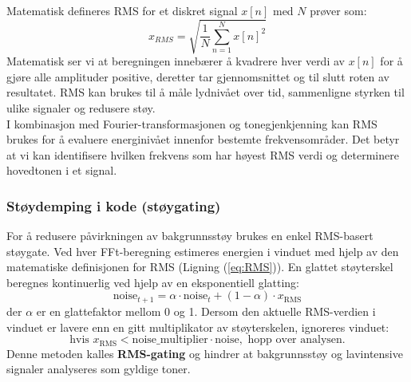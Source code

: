 Matematisk defineres RMS for et diskret signal $x[n]$ med $N$ prøver som:
\begin{equation}
    x_{RMS} = \sqrt{\frac{1}{N} \sum_{n=1}^{N} x[n]^2}
    \label{eq:RMS}
\end{equation}
\noindent
Matematisk ser vi at beregningen innebærer å kvadrere hver verdi av $x[n]$ for å gjøre alle amplituder positive, deretter tar gjennomsnittet og til slutt roten av resultatet. RMS kan brukes til å måle lydnivået over tid, sammenligne styrken til ulike signaler og redusere støy. \\
I kombinasjon med Fourier-transformasjonen og tonegjenkjenning kan RMS brukes for å evaluere energinivået innenfor bestemte frekvensområder. Det betyr at vi kan identifisere hvilken frekvens som har høyest RMS verdi og determinere hovedtonen i et signal.

\subsubsection{Støydemping i kode (støygating)}
For å redusere påvirkningen av bakgrunnsstøy brukes en enkel RMS-basert støygate. Ved hver FFt-beregning estimeres energien i vinduet med hjelp av den matematiske definisjonen for RMS (Ligning (\ref{eq:RMS})). En glattet støyterskel beregnes kontinuerlig ved hjelp av en eksponentiell glatting:
\[
\text{noise}_{t+1} = \alpha \cdot \text{noise}_t + (1 - \alpha) \cdot x_{\text{RMS}}
\]
der $\alpha$ er en glattefaktor mellom 0 og 1. 
Dersom den aktuelle RMS-verdien i vinduet er lavere enn en gitt multiplikator av støyterskelen, ignoreres vinduet:
\[
\text{hvis } x_{\text{RMS}} < \text{noise\_multiplier} \cdot \text{noise}, \text{ hopp over analysen.}
\]
Denne metoden kalles \textbf{RMS-gating} og hindrer at bakgrunnsstøy og lavintensive signaler analyseres som gyldige toner.